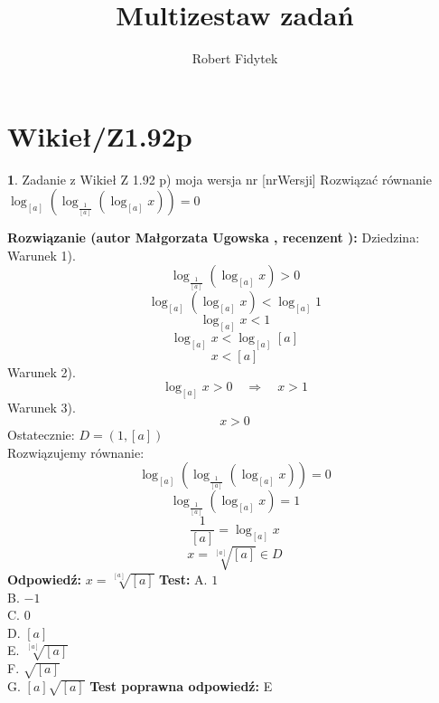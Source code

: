 \documentclass[12pt, a4paper]{article}
\title{Multizestaw zadań}
\author{Robert Fidytek}
\date{}
\theoremstyle{definition} %
\newtheorem{zad}{}
\newcommand{\kategoria}[1]{\section{#1}} %
\newcommand{\zadStart}[1]{\begin{zad}#1\newline} %
\newcommand{\zadStop}{\end{zad}}   %
\newcommand{\rozwStart}[2]{\noindent \textbf{Rozwiązanie (autor #1 , recenzent #2): }\newline} %
\newcommand{\rozwStop}{\newline}                                            %
\newcommand{\odpStart}{\noindent \textbf{Odpowiedź:}\newline}    %
\newcommand{\odpStop}{\newline}                                             %
\newcommand{\testStart}{\noindent \textbf{Test:}\newline} %
\newcommand{\testStop}{\newline} %
\newcommand{\kluczStart}{\noindent \textbf{Test poprawna odpowiedź:}\newline} %
\newcommand{\kluczStop}{\newline} %
\begin{document}
\maketitle


\kategoria{Wikieł/Z1.92p}
\zadStart{Zadanie z Wikieł Z 1.92 p) moja wersja nr [nrWersji]}
Rozwiązać równanie $\log_{[a]}{(\log_{\frac{1}{[a]}}{(\log_{[a]}{x})})}=0$
\zadStop
\rozwStart{Małgorzata Ugowska}{}
Dziedzina:\\
Warunek 1).
$$\log_{\frac{1}{[a]}}{(\log_{[a]}{x})}>0$$
$$ \log_{[a]}{(\log_{[a]}{x})}<\log_{[a]}{1} $$
$$\log_{[a]}{x}<1$$
$$\log_{[a]}{x}<\log_{[a]}{[a]}$$
$$x<[a]$$
Warunek 2).
$$\log_{[a]}{x}>0 \quad \Longrightarrow \quad x>1$$
Warunek 3).
$$x>0$$
Ostatecznie: $D =  (1, [a])$\\
Rozwiązujemy równanie:
$$\log_{[a]}{(\log_{\frac{1}{[a]}}{(\log_{[a]}{x})})}=0$$
$$\log_{\frac{1}{[a]}}{(\log_{[a]}{x})}=1$$
$$\frac{1}{[a]}= \log_{[a]}{x}$$
$$x = \sqrt[[a]]{[a]} \in D$$
\rozwStop
\odpStart
$x = \sqrt[[a]]{[a]}$
\odpStop
\testStart
A. $1$\\
B. $-1$\\
C. $0$\\
D. $[a]$\\
E. $\sqrt[[a]]{[a]}$\\
F. $\sqrt{[a]}$\\
G. $[a]\sqrt{[a]}$
\testStop
\kluczStart
E
\kluczStop
\end{document}

